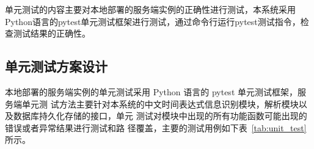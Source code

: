 单元测试的内容主要对本地部署的服务端实例的正确性进行测试，本系统采用Python语言的pytest单元测试框架进行测试，通过命令行运行pytest测试指令，检查测试结果的正确性。

\subsection{单元测试方案设计}


本地部署的服务端实例的单元测试采用 Python 语言的 pytest 单元测试框架，服务端单元测
试方法主要针对本系统的中文时间表达式信息识别模块，解析模块以及数据库持久化存储的接口，单元
测试对模块中出现的所有功能函数可能出现的错误或者异常结果进行测试和路
径覆盖，主要的测试用例如下表~\ref{tab:unit_test} 所示。

\begin{table}[h]
    \centering
    \caption{单元测试方案表}
\end{table}
